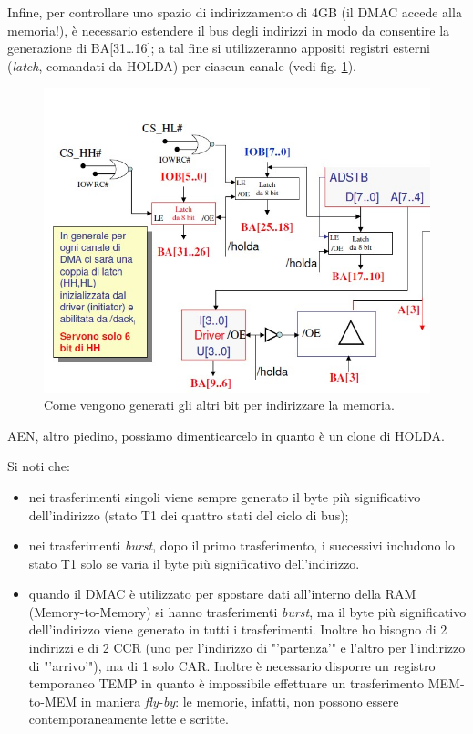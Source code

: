 Infine, per controllare uno spazio di indirizzamento di 4GB (il DMAC accede alla memoria!), è necessario estendere il bus degli indirizzi in modo da consentire la generazione di BA[31\ldots 16]; a tal fine si utilizzeranno appositi registri esterni (\textit{latch}, comandati da HOLDA) per ciascun canale (vedi fig. \ref{fig:altriBit}). 

\begin{figure}[!h]
\centering
\includegraphics[width=0.75\columnwidth]{img/altriBit}
\caption{Come vengono generati gli altri bit per indirizzare la memoria.}
\label{fig:altriBit}
\end{figure}

AEN, altro piedino, possiamo dimenticarcelo in quanto è un clone di HOLDA. 

Si noti che:
\begin{itemize}
\item nei trasferimenti singoli viene sempre generato il byte più significativo dell'indirizzo (stato T1 dei quattro stati del ciclo di bus);
\item nei trasferimenti \textit{burst}, dopo il primo trasferimento, i successivi includono lo stato T1 solo se
varia il byte più significativo dell'indirizzo.
\item quando il DMAC è utilizzato per spostare dati all'interno della RAM (Memory-to-Memory) si hanno trasferimenti \textit{burst}, ma il byte più significativo dell'indirizzo viene generato in
tutti i trasferimenti. Inoltre ho bisogno di 2 indirizzi e di 2 CCR (uno per l'indirizzo di "'partenza'" e l'altro per l'indirizzo di "'arrivo'"), ma di 1 solo CAR. Inoltre è necessario disporre un registro temporaneo TEMP in quanto è impossibile effettuare un trasferimento MEM-to-MEM in maniera \textit{fly-by}: le memorie, infatti, non possono essere contemporaneamente lette e scritte.
\end{itemize}


